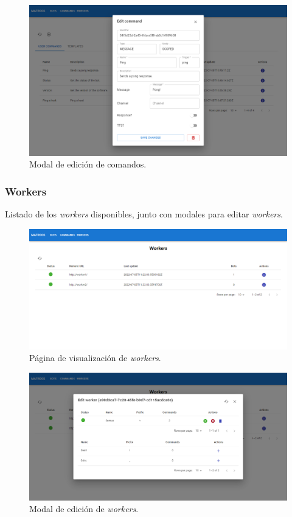 \begin{figure}[H]
	\centering
	\includegraphics[width=1\textwidth]{img/front/page-commands-edit.png}
	\caption{Modal de edición de comandos.}
\end{figure}

\subsubsection{Workers}

Listado de los \textit{workers} disponibles, junto con modales para editar \textit{workers}.

\begin{figure}[H]
	\centering
	\includegraphics[width=1\textwidth]{img/front/page-workers.png}
	\caption{Página de visualización de \textit{workers}.}
\end{figure}

\begin{figure}[H]
	\centering
	\includegraphics[width=1\textwidth]{img/front/page-workers-edit.png}
	\caption{Modal de edición de \textit{workers}.}
\end{figure}

